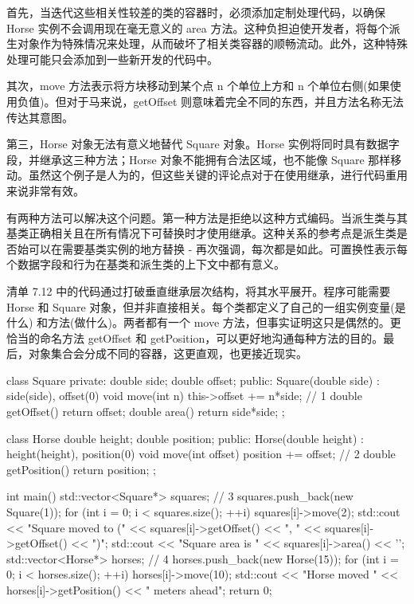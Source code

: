 首先，当迭代这些相关性较差的类的容器时，必须添加定制处理代码，以确保 Horse 实例不会调用现在毫无意义的 area 方法。这种负担迫使开发者，将每个派生对象作为特殊情况来处理，从而破坏了相关类容器的顺畅流动。此外，这种特殊处理可能只会添加到一些新开发的代码中。

其次，move 方法表示将方块移动到某个点 n 个单位上方和 n 个单位右侧(如果使用负值)。但对于马来说，getOffset 则意味着完全不同的东西，并且方法名称无法传达其意图。

第三，Horse 对象无法有意义地替代 Square 对象。Horse 实例将同时具有数据字段，并继承这三种方法；Horse 对象不能拥有合法区域，也不能像 Square 那样移动。虽然这个例子是人为的，但这些关键的评论点对于在使用继承，进行代码重用来说非常有效。


有两种方法可以解决这个问题。第一种方法是拒绝以这种方式编码。当派生类与其基类正确相关且在所有情况下可替换时才使用继承。这种关系的参考点是派生类是否始可以在需要基类实例的地方替换 - 再次强调，每次都是如此。可置换性表示每个数据字段和行为在基类和派生类的上下文中都有意义。

清单 7.12 中的代码通过打破垂直继承层次结构，将其水平展开。程序可能需要 Horse 和 Square 对象，但并非直接相关。每个类都定义了自己的一组实例变量(是什么) 和方法(做什么)。两者都有一个 move 方法，但事实证明这只是偶然的。更恰当的命名方法 getOffset 和 getPosition，可以更好地沟通每种方法的目的。最后，对象集合会分成不同的容器，这更直观，也更接近现实。


\begin{cpp}
class Square {
private:
  double side;
  double offset;
public:
  Square(double side) : side(side), offset(0) {}
  void move(int n) { this->offset += n*side; } // 1
  double getOffset() { return offset; }
  double area() { return side*side; }
};

class Horse {
  double height;
  double position;
public:
  Horse(double height) : height(height), position(0) {}
  void move(int offset) { position += offset; } // 2
  double getPosition() { return position; }
};

int main() {
  std::vector<Square*> squares; // 3
  squares.push_back(new Square(1));
  for (int i = 0; i < squares.size(); ++i) {
    squares[i]->move(2);
    std::cout << "Square moved to (" << squares[i]->getOffset()
      << ", " << squares[i]->getOffset() << ")\n";
    std::cout << "Square area is " << squares[i]->area() << '\n';
  }
  std::vector<Horse*> horses; // 4
  horses.push_back(new Horse(15));
  for (int i = 0; i < horses.size(); ++i) {
    horses[i]->move(10);
    std::cout << "Horse moved " << horses[i]->getPosition()
    << " meters ahead\n";
  }
  return 0;
}
\end{cpp}

